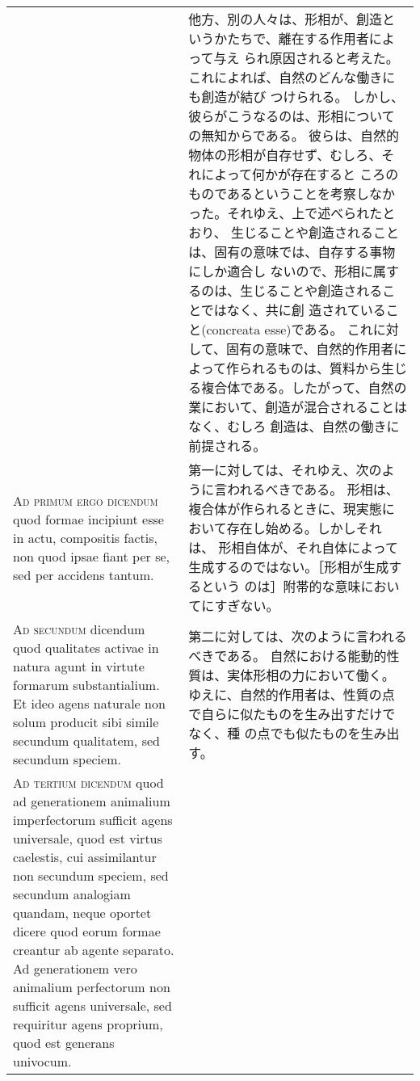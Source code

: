\documentclass[10pt]{jsarticle} %
\begin{document}
\begin{longtable}{p{21em}p{21em}}
&

他方、別の人々は、形相が、創造というかたちで、離在する作用者によって与え
 られ原因されると考えた。これによれば、自然のどんな働きにも創造が結び
 つけられる。
しかし、彼らがこうなるのは、形相についての無知からである。
彼らは、自然的物体の形相が自存せず、むしろ、それによって何かが存在すると
 ころのものであるということを考察しなかった。それゆえ、上で述べられたとおり、
 生じることや創造されることは、固有の意味では、自存する事物にしか適合し
 ないので、形相に属するのは、生じることや創造されることではなく、共に創
 造されていること(concreata esse)である。
これに対して、固有の意味で、自然的作用者によって作られるものは、質料から生じる複合体である。したがって、自然の業において、創造が混合されることはなく、むしろ
 創造は、自然の働きに前提される。

\\


{\scshape Ad primum ergo dicendum} quod formae incipiunt
esse in actu, compositis factis, non quod ipsae fiant per se, sed per
accidens tantum.


&

第一に対しては、それゆえ、次のように言われるべきである。
形相は、複合体が作られるときに、現実態において存在し始める。しかしそれは、
 形相自体が、それ自体によって生成するのではない。［形相が生成するという
 のは］附帯的な意味においてにすぎない。

\\


{\scshape Ad secundum} dicendum quod qualitates activae
in natura agunt in virtute formarum substantialium. Et ideo agens
naturale non solum producit sibi simile secundum qualitatem, sed
secundum speciem.


&

第二に対しては、次のように言われるべきである。
自然における能動的性質は、実体形相の力において働く。
ゆえに、自然的作用者は、性質の点で自らに似たものを生み出すだけでなく、種
 の点でも似たものを生み出す。

\\


{\scshape Ad tertium dicendum} quod ad generationem
animalium imperfectorum sufficit agens universale, quod est virtus
caelestis, cui assimilantur non secundum speciem, sed secundum analogiam
quandam, neque oportet dicere quod eorum formae creantur ab agente
separato. Ad generationem vero animalium perfectorum non sufficit agens
universale, sed requiritur agens proprium, quod est generans univocum.


&


\end{longtable}
\end{document}
